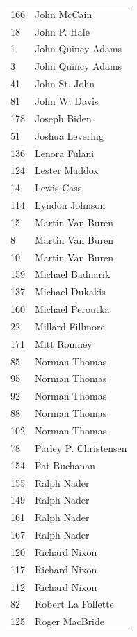\documentclass[
  letterpaper,
  DIV=11,
  numbers=noendperiod]{scrreprt}
\begin{document}
\begin{tabular}{ll}
166 &             John McCain \\
18  &            John P. Hale \\
1   &       John Quincy Adams \\
3   &       John Quincy Adams \\
41  &           John St. John \\
81  &           John W. Davis \\
178 &            Joseph Biden \\
51  &         Joshua Levering \\
136 &           Lenora Fulani \\
124 &           Lester Maddox \\
14  &              Lewis Cass \\
114 &          Lyndon Johnson \\
15  &        Martin Van Buren \\
8   &        Martin Van Buren \\
10  &        Martin Van Buren \\
159 &        Michael Badnarik \\
137 &         Michael Dukakis \\
160 &        Michael Peroutka \\
22  &        Millard Fillmore \\
171 &             Mitt Romney \\
85  &           Norman Thomas \\
95  &           Norman Thomas \\
92  &           Norman Thomas \\
88  &           Norman Thomas \\
102 &           Norman Thomas \\
78  &   Parley P. Christensen \\
154 &            Pat Buchanan \\
155 &             Ralph Nader \\
149 &             Ralph Nader \\
161 &             Ralph Nader \\
167 &             Ralph Nader \\
120 &           Richard Nixon \\
117 &           Richard Nixon \\
112 &           Richard Nixon \\
82  &      Robert La Follette \\
125 &          Roger MacBride \\

\end{tabular}
\end{document}

